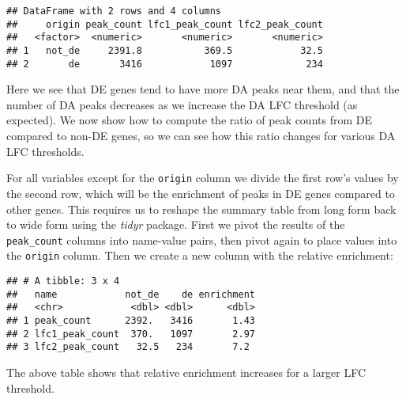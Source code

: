 \documentclass[
]{article}
\newenvironment{Shaded}{}{}
\newcommand{\DataTypeTok}[1]{\textcolor[rgb]{0.56,0.13,0.00}{#1}}
\newcommand{\KeywordTok}[1]{\textcolor[rgb]{0.00,0.44,0.13}{\textbf{#1}}}
\newcommand{\NormalTok}[1]{#1}
\newcommand{\OperatorTok}[1]{\textcolor[rgb]{0.40,0.40,0.40}{#1}}
\newcommand{\StringTok}[1]{\textcolor[rgb]{0.25,0.44,0.63}{#1}}
\begin{document}
\begin{verbatim}
## DataFrame with 2 rows and 4 columns
##     origin peak_count lfc1_peak_count lfc2_peak_count
##   <factor>  <numeric>       <numeric>       <numeric>
## 1   not_de     2391.8           369.5            32.5
## 2       de       3416            1097             234
\end{verbatim}

Here we see that DE genes tend to have more DA peaks near them, and that the
number of DA peaks decreases as we increase the DA LFC threshold (as expected).
We now show how to compute the ratio of peak counts from DE compared to non-DE
genes, so we can see how this ratio changes for various DA LFC thresholds.

For all variables except for the \texttt{origin} column we divide the first row's
values by the second row, which will be the enrichment of peaks in DE genes
compared to other genes. This requires us to reshape the summary table from long
form back to wide form using the \emph{tidyr} package. First we pivot the results of
the \texttt{peak\_count} columns into name-value pairs, then pivot again to place values
into the \texttt{origin} column. Then we create a new column with the relative
enrichment:

\begin{Shaded}
\end{Shaded}

\begin{verbatim}
## # A tibble: 3 x 4
##   name            not_de    de enrichment
##   <chr>            <dbl> <dbl>      <dbl>
## 1 peak_count      2392.   3416       1.43
## 2 lfc1_peak_count  370.   1097       2.97
## 3 lfc2_peak_count   32.5   234       7.2
\end{verbatim}

The above table shows that relative enrichment increases for a larger LFC
threshold.
\end{document}
